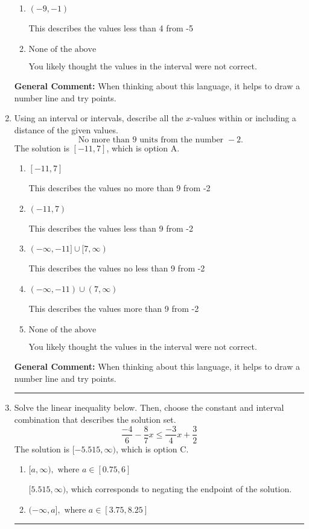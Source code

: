 \documentclass{extbook}[14pt]
\newcommand{\litem}[1]{\item #1

\rule{\textwidth}{0.4pt}}
\begin{document}
\begin{enumerate}
{\begin{enumerate}[label=\Alph*.]
This describes the values no less than 4 from -5
\item \( (-9, -1) \)

This describes the values less than 4 from -5
\item \( \text{None of the above} \)

You likely thought the values in the interval were not correct.
\end{enumerate}

\textbf{General Comment:} When thinking about this language, it helps to draw a number line and try points.
}
\litem{
Using an interval or intervals, describe all the $x$-values within or including a distance of the given values.
\[ \text{ No more than } 9 \text{ units from the number } -2. \]The solution is \( [-11, 7] \), which is option A.\begin{enumerate}[label=\Alph*.]
\item \( [-11, 7] \)

This describes the values no more than 9 from -2
\item \( (-11, 7) \)

This describes the values less than 9 from -2
\item \( (-\infty, -11] \cup [7, \infty) \)

This describes the values no less than 9 from -2
\item \( (-\infty, -11) \cup (7, \infty) \)

This describes the values more than 9 from -2
\item \( \text{None of the above} \)

You likely thought the values in the interval were not correct.
\end{enumerate}

\textbf{General Comment:} When thinking about this language, it helps to draw a number line and try points.
}
\litem{
Solve the linear inequality below. Then, choose the constant and interval combination that describes the solution set.
\[ \frac{-4}{6} - \frac{8}{7} x \leq \frac{-3}{4} x + \frac{3}{2} \]The solution is \( [-5.515, \infty) \), which is option C.\begin{enumerate}[label=\Alph*.]
\item \( [a, \infty), \text{ where } a \in [0.75, 6] \)

 $[5.515, \infty)$, which corresponds to negating the endpoint of the solution.
\item \( (-\infty, a], \text{ where } a \in [3.75, 8.25] \)


\end{enumerate}}
\end{enumerate}
\end{document}
